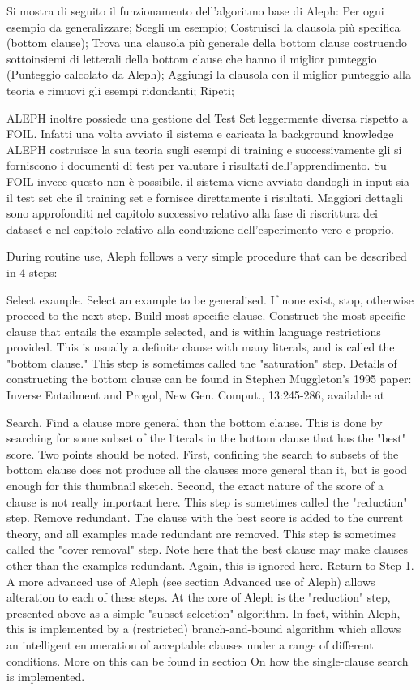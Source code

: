 Si mostra di seguito il funzionamento dell’algoritmo base di Aleph:
Per ogni esempio da generalizzare;
Scegli un esempio;
Costruisci la clausola più specifica (bottom clause);
Trova una clausola più generale della bottom clause costruendo
sottoinsiemi di letterali della bottom clause che hanno il
miglior punteggio (Punteggio calcolato da Aleph);
Aggiungi la clausola con il miglior punteggio alla teoria e
rimuovi gli esempi ridondanti;
Ripeti;

ALEPH inoltre possiede una gestione del Test Set leggermente diversa rispetto a FOIL. Infatti una volta avviato il sistema e caricata la background knowledge ALEPH costruisce la sua teoria sugli esempi di training e successivamente gli si forniscono i documenti di test per valutare i risultati dell’apprendimento. Su FOIL invece questo non è possibile, il sistema viene avviato dandogli in input sia il test set che il training set e fornisce direttamente i risultati. Maggiori dettagli sono approfonditi nel capitolo successivo relativo alla fase di riscrittura dei dataset e nel capitolo relativo alla conduzione dell’esperimento vero e proprio.

During routine use, Aleph follows a very simple procedure that can be described in 4 steps:

Select example. Select an example to be generalised. If none exist, stop, otherwise proceed to the next step.
Build most-specific-clause. Construct the most specific clause that entails the example selected, and is within language restrictions provided. This is usually a definite clause with many literals, and is called the "bottom clause." This step is sometimes called the "saturation" step. Details of constructing the bottom clause can be found in Stephen Muggleton's 1995 paper: Inverse Entailment and Progol, New Gen. Comput., 13:245-286, available at 

Search. Find a clause more general than the bottom clause. This is done by searching for some subset of the literals in the bottom clause that has the "best" score. Two points should be noted. First, confining the search to subsets of the bottom clause does not produce all the clauses more general than it, but is good enough for this thumbnail sketch. Second, the exact nature of the score of a clause is not really important here. This step is sometimes called the "reduction" step.
Remove redundant. The clause with the best score is added to the current theory, and all examples made redundant are removed. This step is sometimes called the "cover removal" step. Note here that the best clause may make clauses other than the examples redundant. Again, this is ignored here. Return to Step 1.
A more advanced use of Aleph (see section Advanced use of Aleph) allows alteration to each of these steps. At the core of Aleph is the "reduction" step, presented above as a simple "subset-selection" algorithm. In fact, within Aleph, this is implemented by a (restricted) branch-and-bound algorithm which allows an intelligent enumeration of acceptable clauses under a range of different conditions. More on this can be found in section On how the single-clause search is implemented.



